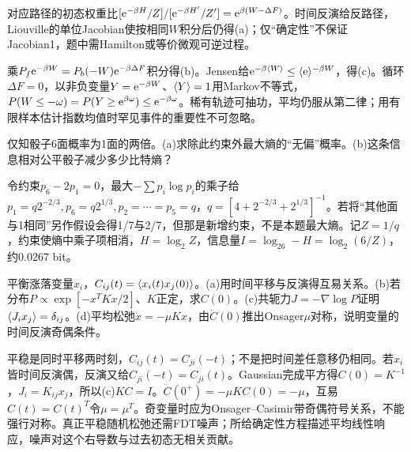 \begin{solution}
对应路径的初态权重比$[\mathrm e^{-\beta H}/Z]/[\mathrm e^{-\beta H'}/Z']=\mathrm e^{\beta(W-\Delta F)}$。时间反演给反路径，Liouville的单位Jacobian使按相同$W$积分后仍得(a)；仅“确定性”不保证Jacobian1，题中需Hamilton或等价微观可逆过程。

乘$P_f\mathrm e^{-\beta W}=P_b(-W)\mathrm e^{-\beta\Delta F}$积分得(b)。Jensen给$\mathrm e^{-\beta\langle W\rangle}\le\langle \mathrm e\rangle^{-\beta W}$，得(c)。循环$\Delta F=0$，以非负变量$Y=\mathrm e^{-\beta W}$、$\langle Y\rangle=1$用Markov不等式，$P(W\le-\omega)=P(Y\ge\mathrm e^{\beta\omega})\le\mathrm e^{-\beta\omega}$。稀有轨迹可抽功，平均仍服从第二律；用有限样本估计指数均值时罕见事件的重要性不可忽略。
\end{solution}
\begin{exercise}[原题7(a)--(b)，选做]\label{p:333-2-7}
仅知骰子6面概率为1面的两倍。(a)求除此约束外最大熵的“无偏”概率。(b)这条信息相对公平骰子减少多少比特熵？
\end{exercise}
\begin{solution}
令约束$p_6-2p_1=0$，最大$-\sum p_i\log p_i$的乘子给$p_1=q2^{-2/3},p_6=q2^{1/3},p_2=\cdots=p_5=q$，$q=[4+2^{-2/3}+2^{1/3}]^{-1}$。若将“其他面与1相同”另作假设会得1/7与2/7，但那是新增约束，不是本题最大熵。记$Z=1/q$，约束使熵中乘子项相消，$H=\log_2Z$，信息量$I=\log_26-H=\log_2(6/Z)$，约0.0267 bit。
\end{solution}
\begin{exercise}[原题8(a)--(d)，选做]\label{p:333-2-8}
平衡涨落变量$x_i$，$C_{ij}(t)=\langle x_i(t)x_j(0)\rangle$。(a)用时间平移与反演得互易关系。(b)若分布$P\propto\exp[-x^TKx/2]$、$K$正定，求$C(0)$。(c)共轭力$J=-\nabla\log P$证明$\langle J_ix_j\rangle=\delta_{ij}$。(d)平均松弛$\dot x=-\mu Kx$，由$\dot C(0)$推出Onsager$\mu$对称，说明变量的时间反演奇偶条件。
\end{exercise}
\begin{solution}
平稳是同时平移两时刻，$C_{ij}(t)=C_{ji}(-t)$；不是把时间差任意移仍相同。若$x_i$皆时间反演偶，反演又给$C_{ji}(-t)=C_{ji}(t)$。Gaussian完成平方得$C(0)=K^{-1}$，$J_i=K_{ij}x_j$，所以(c)$KC=I$。$\dot C(0^+)=-\mu KC(0)=-\mu$，互易$C(t)=C(t)^T$令$\mu=\mu^T$。奇变量时应为Onsager--Casimir带奇偶符号关系，不能强行对称。真正平稳随机松弛还需FDT噪声；所给确定性方程描述平均线性响应，噪声对这个右导数与过去初态无相关贡献。
\end{solution}
